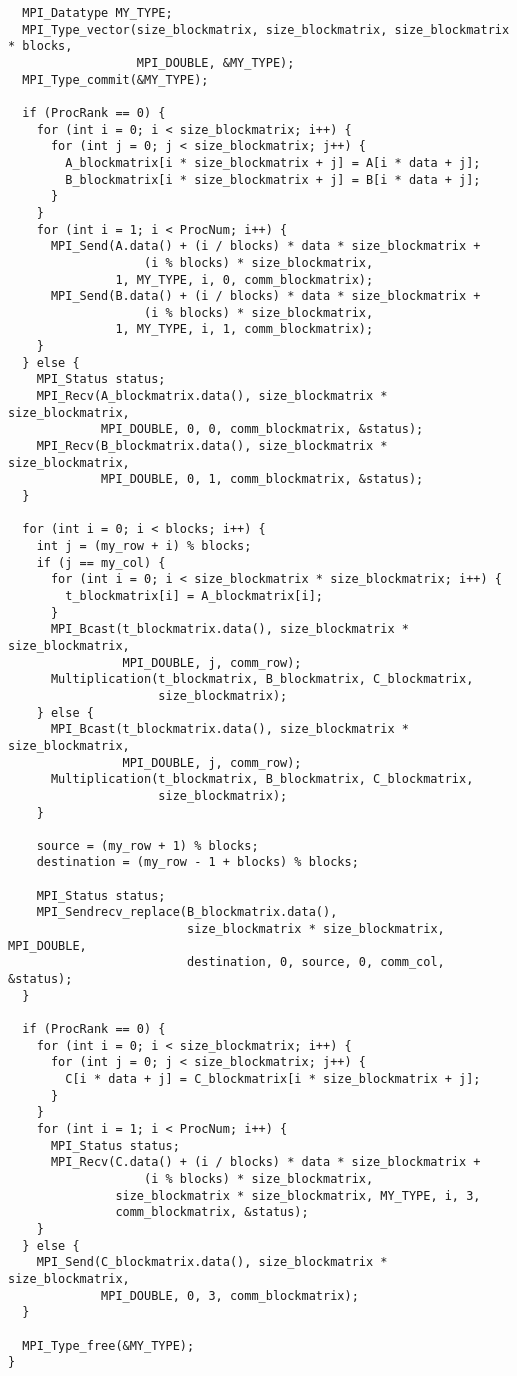 \documentclass{report}
\begin{document}
\begin{lstlisting}
  MPI_Datatype MY_TYPE;
  MPI_Type_vector(size_blockmatrix, size_blockmatrix, size_blockmatrix * blocks,
                  MPI_DOUBLE, &MY_TYPE);
  MPI_Type_commit(&MY_TYPE);

  if (ProcRank == 0) {
    for (int i = 0; i < size_blockmatrix; i++) {
      for (int j = 0; j < size_blockmatrix; j++) {
        A_blockmatrix[i * size_blockmatrix + j] = A[i * data + j];
        B_blockmatrix[i * size_blockmatrix + j] = B[i * data + j];
      }
    }
    for (int i = 1; i < ProcNum; i++) {
      MPI_Send(A.data() + (i / blocks) * data * size_blockmatrix +
                   (i % blocks) * size_blockmatrix,
               1, MY_TYPE, i, 0, comm_blockmatrix);
      MPI_Send(B.data() + (i / blocks) * data * size_blockmatrix +
                   (i % blocks) * size_blockmatrix,
               1, MY_TYPE, i, 1, comm_blockmatrix);
    }
  } else {
    MPI_Status status;
    MPI_Recv(A_blockmatrix.data(), size_blockmatrix * size_blockmatrix,
             MPI_DOUBLE, 0, 0, comm_blockmatrix, &status);
    MPI_Recv(B_blockmatrix.data(), size_blockmatrix * size_blockmatrix,
             MPI_DOUBLE, 0, 1, comm_blockmatrix, &status);
  }

  for (int i = 0; i < blocks; i++) {
    int j = (my_row + i) % blocks;
    if (j == my_col) {
      for (int i = 0; i < size_blockmatrix * size_blockmatrix; i++) {
        t_blockmatrix[i] = A_blockmatrix[i];
      }
      MPI_Bcast(t_blockmatrix.data(), size_blockmatrix * size_blockmatrix,
                MPI_DOUBLE, j, comm_row);
      Multiplication(t_blockmatrix, B_blockmatrix, C_blockmatrix,
                     size_blockmatrix);
    } else {
      MPI_Bcast(t_blockmatrix.data(), size_blockmatrix * size_blockmatrix,
                MPI_DOUBLE, j, comm_row);
      Multiplication(t_blockmatrix, B_blockmatrix, C_blockmatrix,
                     size_blockmatrix);
    }

    source = (my_row + 1) % blocks;
    destination = (my_row - 1 + blocks) % blocks;

    MPI_Status status;
    MPI_Sendrecv_replace(B_blockmatrix.data(),
                         size_blockmatrix * size_blockmatrix, MPI_DOUBLE,
                         destination, 0, source, 0, comm_col, &status);
  }

  if (ProcRank == 0) {
    for (int i = 0; i < size_blockmatrix; i++) {
      for (int j = 0; j < size_blockmatrix; j++) {
        C[i * data + j] = C_blockmatrix[i * size_blockmatrix + j];
      }
    }
    for (int i = 1; i < ProcNum; i++) {
      MPI_Status status;
      MPI_Recv(C.data() + (i / blocks) * data * size_blockmatrix +
                   (i % blocks) * size_blockmatrix,
               size_blockmatrix * size_blockmatrix, MY_TYPE, i, 3,
               comm_blockmatrix, &status);
    }
  } else {
    MPI_Send(C_blockmatrix.data(), size_blockmatrix * size_blockmatrix,
             MPI_DOUBLE, 0, 3, comm_blockmatrix);
  }

  MPI_Type_free(&MY_TYPE);
}

\end{lstlisting}
\end{document}
